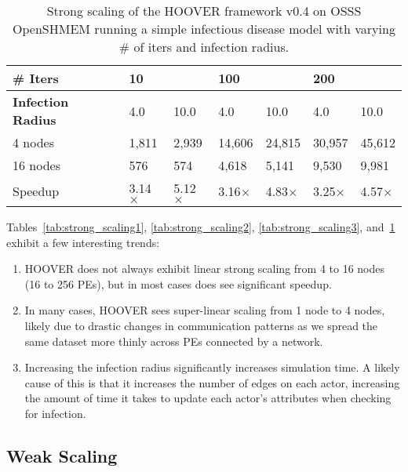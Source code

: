 \begin{table}
\centering
\begin{tabularx}{\textwidth}{ | l || X | X | X | X | X | X | }
\hline
\textbf{\# Iters}           & \multicolumn{2}{|X|}{\textbf{10}} & \multicolumn{2}{|X|}{\textbf{100}} & \multicolumn{2}{|X|}{\textbf{200}} \\\hline
\textbf{Infection Radius}   & 4.0          & 10.0         & 4.0           & 10.0          & 4.0           & 10.0 \\\hline
4 nodes                     &  1,811       & 2,939        & 14,606       & 24,815       & 30,957       & 45,612 \\\hline
16 nodes                    &   576        &  574         &  4,618       &  5,141       &  9,530       &  9,981 \\\hline
Speedup                     & 3.14$\times$ & 5.12$\times$ & 3.16$\times$ & 4.83$\times$ & 3.25$\times$ & 4.57$\times$ \\\hline
\end{tabularx}
\caption{Strong scaling of the HOOVER framework v0.4 on OSSS OpenSHMEM running a
    simple infectious disease model with varying \# of iters and infection
    radius.}
\label{tab:strong_scaling4}
\end{table}


Tables~\ref{tab:strong_scaling1}, \ref{tab:strong_scaling2},
\ref{tab:strong_scaling3}, and~\ref{tab:strong_scaling4} exhibit a few interesting trends:

\begin{enumerate}
    \item HOOVER does not always exhibit linear strong scaling from 4 to 16
        nodes (16 to 256 PEs), but in most cases does see significant speedup.
    \item In many cases, HOOVER sees super-linear scaling from 1 node to 4
        nodes, likely due to drastic changes in communication patterns as we
        spread the same dataset more thinly across PEs connected by a network.
    \item Increasing the infection radius significantly increases simulation
        time. A likely cause of this is that it increases the number of edges on
        each actor, increasing the amount of time it takes to update each
        actor's attributes when checking for infection.
\end{enumerate}

\subsection{Weak Scaling}
\label{sec:weak_scaling}

